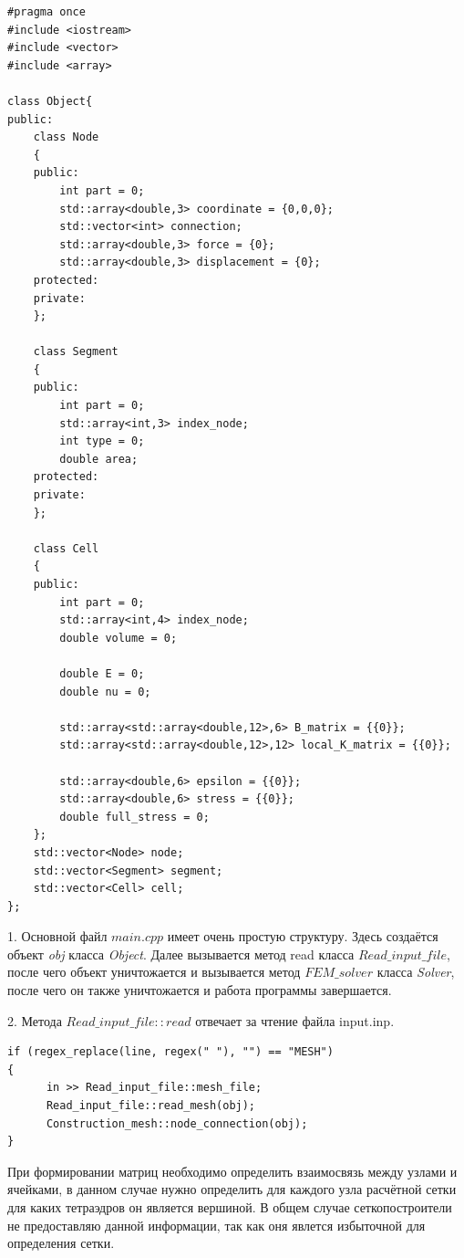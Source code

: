 \documentclass[a4paper,12pt]{article}
\begin{document}
\begin{scriptsize}
\begin{verbatim}	
#pragma once
#include <iostream>
#include <vector>
#include <array>

class Object{
public:
	class Node
	{
	public:
		int part = 0;
		std::array<double,3> coordinate = {0,0,0};	
		std::vector<int> connection;	
		std::array<double,3> force = {0};
		std::array<double,3> displacement = {0};			
	protected:
	private:				
	}; 

	class Segment
	{
	public:
		int part = 0;
		std::array<int,3> index_node;	
		int type = 0;
		double area;
	protected:
	private:					
	};  

	class Cell
	{
	public:
		int part = 0;
		std::array<int,4> index_node;	
		double volume = 0;

		double E = 0;
		double nu = 0;
		
		std::array<std::array<double,12>,6> B_matrix = {{0}};  
		std::array<std::array<double,12>,12> local_K_matrix = {{0}};

		std::array<double,6> epsilon = {{0}};
		std::array<double,6> stress = {{0}};
		double full_stress = 0;
	};
	std::vector<Node> node;			
	std::vector<Segment> segment;	
	std::vector<Cell> cell;
};
\end{verbatim}
\end{scriptsize}  	
 	
 	
	1. Основной файл $main.cpp$ имеет очень простую структуру. Здесь создаётся объект \textit{obj} класса \textit{Object}. Далее вызывается метод read класса $Read\_input\_file$, после чего объект уничтожается и вызывается метод $FEM\_solver$ класса \textit{Solver}, после чего он также уничтожается и работа программы завершается.
	
	2. Метода $Read\_input\_file::read$ отвечает за чтение файла input.inp.

\begin{scriptsize}
\begin{verbatim}	
if (regex_replace(line, regex(" "), "") == "MESH")
{	
      in >> Read_input_file::mesh_file; 	
      Read_input_file::read_mesh(obj);
      Construction_mesh::node_connection(obj); 
}
\end{verbatim}
\end{scriptsize} 

При формировании матриц необходимо определить взаимосвязь между узлами и ячейками, в данном случае нужно определить для каждого узла расчётной сетки для каких тетраэдров он является вершиной. В общем случае сеткопостроители не предоставляю данной информации, так как оня явлется избыточной для определения сетки.
\end{document}
